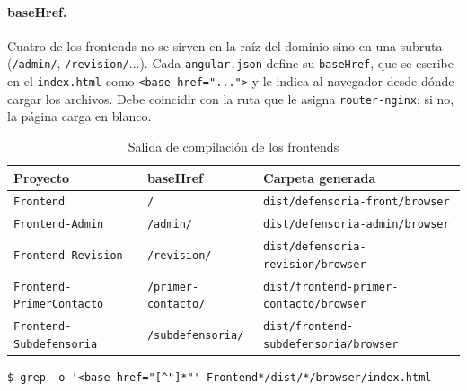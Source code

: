 \paragraph{baseHref.} Cuatro de los frontends no se sirven en la raíz del dominio sino en una subruta (\texttt{/admin/}, \texttt{/revision/}...). Cada \texttt{angular.json} define su \texttt{baseHref}, que se escribe en el \texttt{index.html} como \texttt{<base href="...">} y le indica al navegador desde dónde cargar los archivos. Debe coincidir con la ruta que le asigna \texttt{router-nginx}; si no, la página carga en blanco.
\begin{table}[H]
\centering
\caption{Salida de compilación de los frontends}
\small
\begin{tabular}{llp{5.6cm}}
\toprule
\textbf{Proyecto} & \textbf{baseHref} & \textbf{Carpeta generada} \\
\midrule
\texttt{Frontend} & \texttt{/} & \nolinkurl{dist/defensoria-front/browser} \\
\texttt{Frontend-Admin} & \texttt{/admin/} & \nolinkurl{dist/defensoria-admin/browser} \\
\texttt{Frontend-Revision} & \texttt{/revision/} & \nolinkurl{dist/defensoria-revision/browser} \\
\texttt{Frontend-PrimerContacto} & \texttt{/primer-contacto/} & \nolinkurl{dist/frontend-primer-contacto/browser} \\
\texttt{Frontend-Subdefensoria} & \texttt{/subdefensoria/} & \nolinkurl{dist/frontend-subdefensoria/browser} \\
\bottomrule
\end{tabular}
\end{table}
\begin{lstlisting}
$ grep -o '<base href="[^"]*"' Frontend*/dist/*/browser/index.html
\end{lstlisting}
